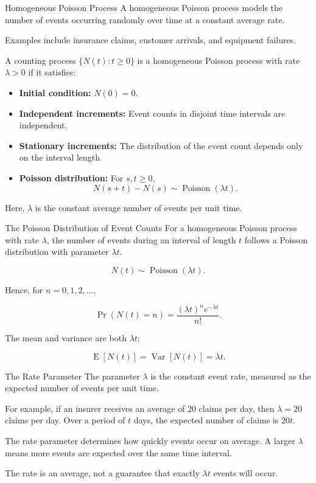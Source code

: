 \documentclass[
  ignorenonframetext,
  aspectratio=169,
]{beamer}
\providecommand{\tightlist}{%
  \setlength{\itemsep}{0pt}\setlength{\parskip}{0pt}}
\begin{document}
\begin{frame}{Homogeneous Poisson Process}
\protect{}\label{homogeneous-poisson-process}
A homogeneous Poisson process models the number of events occurring
randomly over time at a constant average rate.

Examples include insurance claims, customer arrivals, and equipment
failures.

A counting process \(\{N(t):t\geq 0\}\) is a homogeneous Poisson process
with rate \(\lambda>0\) if it satisfies:

\begin{itemize}
\tightlist
\item
  \textbf{Initial condition:} \(N(0)=0\).
\item
  \textbf{Independent increments:} Event counts in disjoint time
  intervals are independent.
\item
  \textbf{Stationary increments:} The distribution of the event count
  depends only on the interval length.
\item
  \textbf{Poisson distribution:} For \(s,t\geq 0\), \[
  N(s+t)-N(s)\sim\operatorname{Poisson}(\lambda t).
  \]
\end{itemize}

Here, \(\lambda\) is the constant average number of events per unit
time.
\end{frame}

\begin{frame}{The Poisson Distribution of Event Counts}
\protect{}\label{the-poisson-distribution-of-event-counts}
For a homogeneous Poisson process with rate \(\lambda\), the number of
events during an interval of length \(t\) follows a Poisson distribution
with parameter \(\lambda t\).

\[
N(t)\sim\operatorname{Poisson}(\lambda t).
\]

Hence, for \(n=0,1,2,\ldots\),

\[
\Pr(N(t)=n)=
\frac{(\lambda t)^n e^{-\lambda t}}{n!}.
\]

The mean and variance are both \(\lambda t\):

\[
\operatorname{E}[N(t)]=\operatorname{Var}[N(t)]=\lambda t.
\]
\end{frame}

\begin{frame}{The Rate Parameter}
\protect{}\label{the-rate-parameter}
The parameter \(\lambda\) is the constant event rate, measured as the
expected number of events per unit time.

For example, if an insurer receives an average of 20 claims per day,
then \(\lambda=20\) claims per day. Over a period of \(t\) days, the
expected number of claims is \(20t\).

The rate parameter determines how quickly events occur on average. A
larger \(\lambda\) means more events are expected over the same time
interval.

The rate is an average, not a guarantee that exactly \(\lambda t\)
events will occur.
\end{frame}
\end{document}
